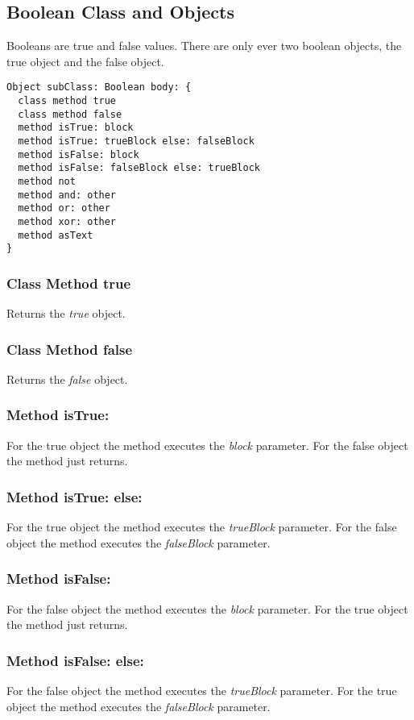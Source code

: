 \subsection {Boolean Class and Objects}

Booleans are true and false values. There are only ever two boolean objects, the true object and the false object.

\begin{lstlisting}
Object subClass: Boolean body: {
  class method true
  class method false
  method isTrue: block
  method isTrue: trueBlock else: falseBlock
  method isFalse: block
  method isFalse: falseBlock else: trueBlock
  method not
  method and: other
  method or: other
  method xor: other
  method asText
}
\end{lstlisting}

\subsubsection{Class Method true}
Returns the \textit{true} object.

\subsubsection{Class Method false}
Returns the \textit{false} object.

\subsubsection{Method isTrue:}
For the true object the method executes the \textit{block} parameter. For the false object the method just returns.

\subsubsection{Method isTrue: else:}
For the true object the method executes the \textit{trueBlock} parameter. For the false object the method executes the \textit{falseBlock} parameter.

\subsubsection{Method isFalse:}
For the false object the method executes the \textit{block} parameter. For the true object the method just returns.

\subsubsection{Method isFalse: else:}
For the false object the method executes the \textit{trueBlock} parameter. For the true object the method executes the \textit{falseBlock} parameter.

